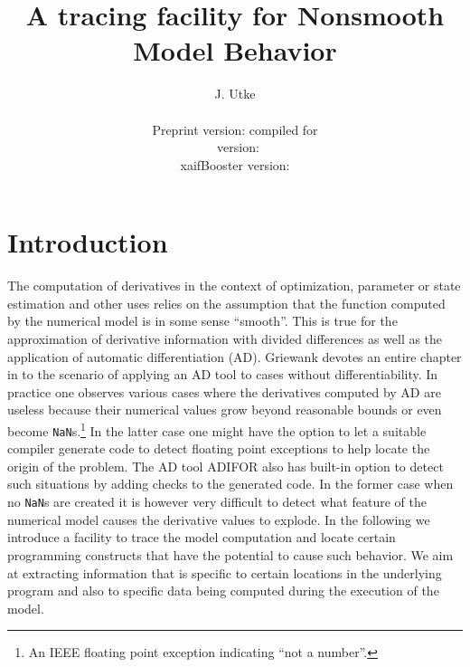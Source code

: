 \documentclass{article}
\title{A tracing facility for Nonsmooth Model Behavior}
\author{J. Utke\\\\
        \small Preprint version:  compiled for \\
        \small \openad\ version: \\
        \small xaifBooster version: \\
}
\date{ }
\begin{document}
\maketitle
{}
\lstset{basicstyle=\small\tt, 
	numbers=left, 
	numberstyle=\scriptsize,
  	stepnumber=1, 
	numbersep=10pt, 
	breaklines=true,
	resetmargins=false,
	xleftmargin=6ex,
	columns=fullflexible}
\section{Introduction}

The computation of derivatives in the context of optimization, parameter or state estimation 
and other uses relies on the assumption that the function computed by the numerical 
model is in some sense ``smooth''. 
This is true for the approximation of derivative information with divided differences 
as well as the application of automatic differentiation (AD). 
Griewank devotes an entire chapter in \cite{Gri00} 
to the scenario of applying an AD tool to cases without differentiability. 
In practice one observes various cases where the derivatives computed by AD are useless 
because their numerical values grow  beyond reasonable bounds \cite{tfs-delayed,tfs-chain} or even 
become \lstinline{NaN}s.\footnote{
An IEEE floating point exception indicating ``not a number''.
} 
In the latter case one might have the option to let a suitable compiler generate 
code to detect floating point exceptions to help locate the origin of the problem.
The AD  tool ADIFOR \cite{adiforWeb} also has built-in  option to detect 
such situations by adding checks to the generated code.   
In the former case when no \lstinline{NaN}s are created it is however very difficult to 
detect what feature of the numerical model causes the derivative values to explode. 
In the following we introduce a facility to trace the model computation and locate 
certain programming constructs that have the potential to cause 
such behavior. We aim at extracting information that is specific to 
certain locations in the underlying program and also to specific data 
being computed during the execution of the model.  
   
\end{document}
